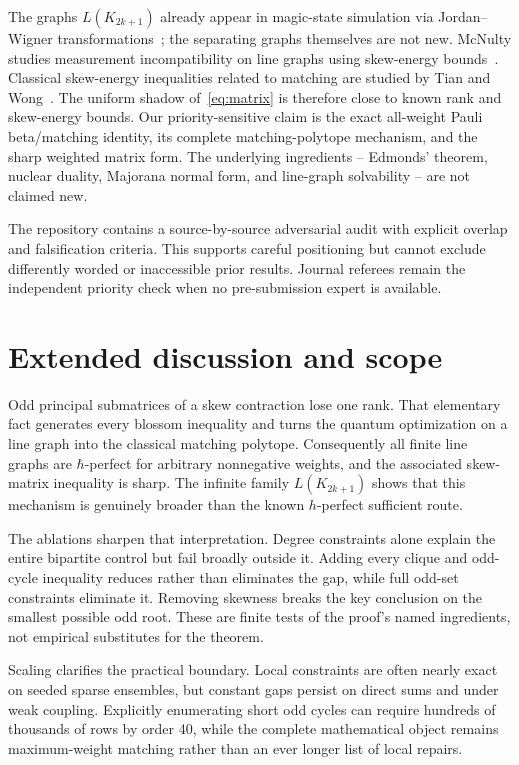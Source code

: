 \documentclass[11pt,a4paper]{article}
\theoremstyle{remark}
\begin{document}
The graphs $L(K_{2k+1})$ already appear in magic-state simulation via
Jordan--Wigner transformations~\cite{zurel}; the separating graphs themselves
are not new. McNulty studies measurement incompatibility on line graphs using
skew-energy bounds~\cite{mcnulty}. Classical skew-energy inequalities related
to matching are studied by Tian and Wong~\cite{tianwong}. The uniform shadow
of~\eqref{eq:matrix} is therefore close to known rank and skew-energy bounds.
Our priority-sensitive claim is the exact all-weight Pauli beta/matching
identity, its complete matching-polytope mechanism, and the sharp weighted
matrix form. The underlying ingredients -- Edmonds' theorem, nuclear duality,
Majorana normal form, and line-graph solvability -- are not claimed new.

The repository contains a source-by-source adversarial audit with explicit
overlap and falsification criteria. This supports careful positioning but
cannot exclude differently worded or inaccessible prior results. Journal
referees remain the independent priority check when no pre-submission expert
is available.

\section{Extended discussion and scope}

Odd principal submatrices of a skew contraction lose one rank. That elementary
fact generates every blossom inequality and turns the quantum optimization on
a line graph into the classical matching polytope. Consequently all finite
line graphs are $\hbar$-perfect for arbitrary nonnegative weights, and the
associated skew-matrix inequality is sharp. The infinite family
$L(K_{2k+1})$ shows that this mechanism is genuinely broader than the known
$h$-perfect sufficient route.

The ablations sharpen that interpretation. Degree constraints alone explain
the entire bipartite control but fail broadly outside it. Adding every clique
and odd-cycle inequality reduces rather than eliminates the gap, while full
odd-set constraints eliminate it. Removing skewness breaks the key conclusion
on the smallest possible odd root. These are finite tests of the proof's
named ingredients, not empirical substitutes for the theorem.

Scaling clarifies the practical boundary. Local constraints are often nearly
exact on seeded sparse ensembles, but constant gaps persist on direct sums and
under weak coupling. Explicitly enumerating short odd cycles can require
hundreds of thousands of rows by order 40, while the complete mathematical
object remains maximum-weight matching rather than an ever longer list of
local repairs.
\end{document}
